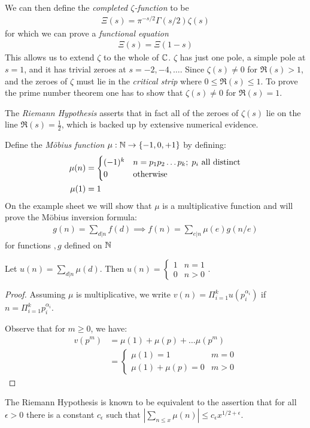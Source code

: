 \documentclass[10pt,a4paper]{article}
\begin{document}
We can then define the \emph{completed $\zeta$-function} to be
\begin{align*}
\Xi(s) = \pi^{-s/2} \Gamma(s/2) \zeta(s)
\end{align*}
for which we can prove a \emph{functional equation}
\begin{align*}
\Xi(s) = \Xi(1-s)
\end{align*}
This allows us to extend $\zeta$ to the whole of $\mathbb{C}$. $\zeta$ has just one pole, a simple pole at $s=1$, and it has trivial zeroes at $s=-2,-4,\ldots$. Since $\zeta(s) \neq 0$ for $\Re(s)>1$, and the zeroes of $\zeta$ must lie in the \emph{critical strip} where $0 \leq \Re(s) \leq 1$. To prove the prime number theorem one has to show that $\zeta(s) \neq 0$ for $\Re(s) = 1$.

The \emph{Riemann Hypothesis} asserts that in fact all of the zeroes of $\zeta(s)$ lie on the line $\Re(s) = \frac{1}{2}$, which is backed up by extensive numerical evidence.

Define the \emph{M\"obius function} $\mu: \mathbb{N} \to \{-1,0,+1\}$ by defining:
\begin{align*}
\mu(n) &= \begin{cases} (-1)^k & n = p_1p_2\ldots p_k;\; p_i \text{ all distinct}\\
0 & \text{otherwise} \end{cases}\\
\mu(1) &= 1
\end{align*}
On the example sheet we will show that $\mu$ is a multiplicative function and will prove the M\"obius inversion formula:
\begin{align*}
g(n) = \sum_{d|n} f(d) \implies f(n) = \sum_{e|n} \mu(e)g(n/e)
\end{align*}
for functions $, g$ defined on $\mathbb{N}$

\begin{lemma}
Let $u(n) = \sum_{d|n} \mu(d)$. Then $u(n) = \begin{cases} 1 & n=1 \\ 0 & n > 0 \end{cases}$.
\end{lemma}
\begin{proof}
Assuming $\mu$ is multiplicative, we write $v(n) = \Pi_{i=1}^k u(p_i^{\alpha_i})$ if $n = \Pi_{i=1}^{k} p_i^{\alpha_i}$.

Observe that for $m \geq 0$, we have:
\begin{align*}
v(p^m) &= \mu(1) + \mu(p) + \ldots \mu(p^m) \\
&= \begin{cases} \mu(1) = 1 & m=0\\ \mu(1) + \mu(p) = 0 & m > 0\end{cases}
\end{align*}
\end{proof}
The Riemann Hypothesis is known to be equivalent to the assertion that for all $\epsilon > 0$ there is a constant $c_{\epsilon}$ such that $|\sum_{n \leq x} \mu(n) | \leq c_{\epsilon} x^{1/2 + \epsilon}$.
\end{document}
